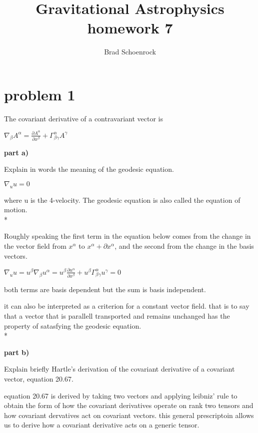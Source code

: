 \documentclass{article}
\title{Gravitational Astrophysics homework 7}
\author{Brad Schoenrock}
\date{}
\begin{document}
\maketitle
\Large


\section{problem 1}

\hspace{0.5cm} The covariant derivative of a contravariant vector is 
\begin{center}
$\nabla_{\beta}A^{\alpha}=\frac{\partial A^{\alpha}}{\partial x^{\beta}}+\Gamma^{\alpha}_{\beta\gamma}A^{\gamma}$
\end{center}

\textbf{part a)} 

Explain in words the meaning of the geodesic equation.
\begin{center}
$\nabla_{u}u=0$
\end{center}
where u is the 4-velocity. The geodesic equation is also called the equation of motion.
\\*

Roughly speaking the first term in the equation below comes from the change in the vector field from $x^{\alpha}$ to $x^{\alpha}+\partial x^{\alpha}$, and the second from the change in the basis vectors.
\begin{center}
$\nabla_{u}u=u^{\beta}\nabla_{\beta}u^{\alpha}=u^{\beta}\frac{\partial u^{\alpha}}{\partial x^{\beta}}+u^{\beta}\Gamma^{\alpha}_{\beta\gamma}u^{\gamma}=0$
\end{center}

both terms are basis dependent but the sum is basis independent.

it can also be interpreted as a criterion for a constant vector field. that is to say that a vector that is parallell transported and remains unchanged has the property of satasfying the geodesic equation. 
\\*

\textbf{part b)} 

Explain briefly Hartle's derivation of the covariant derivative of a covariant vector, equation 20.67.

equation 20.67 is derived by taking two vectors and applying leibniz' rule to obtain the form of how the covariant derivatives operate on rank two tensors and how covariant dervatives act on covariant vectors. this general prescriptoin allows us to derive how a covariant derivative acts on a generic tensor. 
\end{document}
